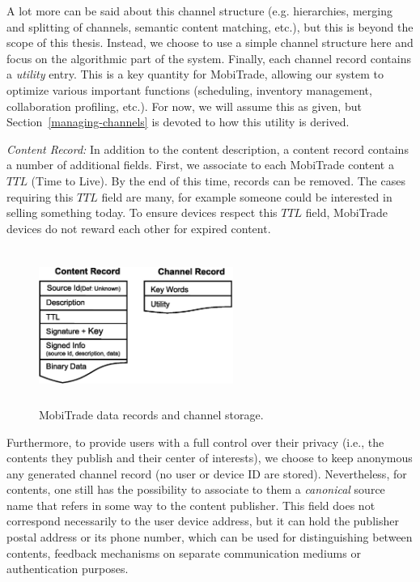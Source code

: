 A lot more can be said about this channel structure (e.g. hierarchies, merging and splitting of channels, semantic content matching, etc.), but this is beyond the scope of this thesis. Instead, we choose to use a simple channel structure here and focus on the algorithmic part of the system. Finally, each channel record contains a \emph{utility} entry. This is a key quantity for MobiTrade, allowing our system to optimize various important functions (scheduling, inventory management, collaboration profiling, etc.). For now, we will assume this as given, but Section~\ref{managing-channels} is devoted to how this utility is derived.

\emph{Content Record:} In addition to the content description, a content record contains a number of additional fields. First, we associate to each MobiTrade content a $TTL$ (Time to Live). By the end of this time, records can be removed. The cases requiring this $TTL$ field are many, for example someone could be interested in selling something today. To ensure devices respect this $TTL$ field, MobiTrade devices do not reward each other for expired content.

\begin{figure}[!h]
\centering
\includegraphics[width=2.5in,height=2in]{Chapitre5/ContentsInterestsRecords.eps}
\caption{MobiTrade data records and channel storage.}
\label{records}
\end{figure}

Furthermore, to provide users with a full control over their privacy (i.e., the contents they publish and their center of interests), we choose to keep anonymous any generated channel record (no user or device ID are stored). Nevertheless, for contents, one still has the possibility to associate to them a \emph{canonical} source name that refers in some way to the content publisher. This field does not correspond necessarily to the user device address, but it can hold the publisher postal address or its phone number, which can be used for distinguishing between contents, feedback mechanisms on separate communication mediums or authentication purposes.

